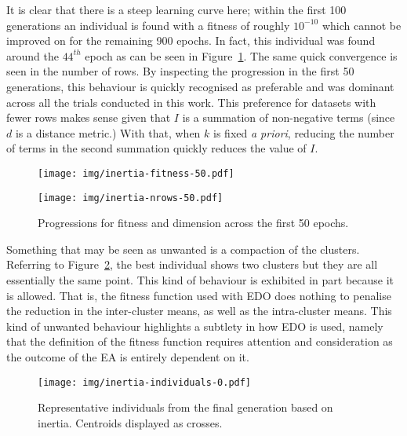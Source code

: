 It is clear that there is a steep learning curve here; within the first 100
generations an individual is found with a fitness of roughly \(10^{-10}\) which
cannot be improved on for the remaining 900 epochs. In fact, this individual was
found around the \(44^{th}\) epoch as can be seen in
Figure~\ref{figure:inertia-50}. The same quick convergence is seen in the number
of rows. By inspecting the progression in the first 50 generations, this
behaviour is quickly recognised as preferable and was dominant across all the
trials conducted in this work. This preference for datasets with fewer rows
makes sense given that \(I\) is a summation of non-negative terms (since \(d\)
is a distance metric.) With that, when \(k\) is fixed \textit{a priori},
reducing the number of terms in the second summation quickly reduces the value
of \(I\). 

\begin{figure}[htbp]
    \centering
    \begin{minipage}{\imgwidth}
        \centering
        \texttt{[image: img/inertia-fitness-50.pdf]}
    \end{minipage}

    \begin{minipage}{\imgwidth}
        \centering
        \texttt{[image: img/inertia-nrows-50.pdf]}
    \end{minipage}
    \caption{Progressions for fitness and dimension across the first 50
             epochs.}\label{figure:inertia-50}
\end{figure}

Something that may be seen as unwanted is a compaction of the clusters.
Referring to Figure~\ref{figure:inertia-individuals}, the best individual shows
two clusters but they are all essentially the same point. This kind of behaviour
is exhibited in part because it is allowed. That is, the fitness function used
with EDO does nothing to penalise the reduction in the inter-cluster means, as
well as the intra-cluster means. This kind of unwanted behaviour highlights a
subtlety in how EDO is used, namely that the definition of the fitness function
requires attention and consideration as the outcome of the EA is entirely
dependent on it.

\begin{figure}[htbp]
    \centering
    \texttt{[image: img/inertia-individuals-0.pdf]}
    \caption{Representative individuals from the final generation based on
             inertia. Centroids displayed as
             crosses.}\label{figure:inertia-individuals}
\end{figure}

